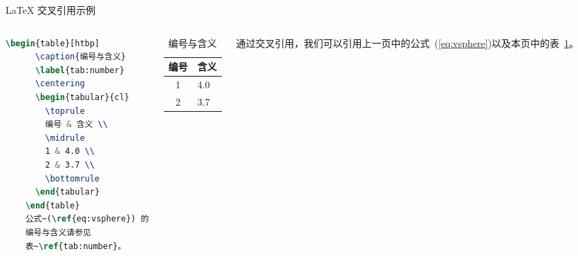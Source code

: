 \documentclass{beamer} %
\begin{document}
\begin{frame}[fragile]{\LaTeX{} 交叉引用示例}
    \begin{columns}
\begin{lstlisting}[language=TeX]
    \begin{table}[htbp]
      \caption{编号与含义}
      \label{tab:number}
      \centering
      \begin{tabular}{cl}
        \toprule
        编号 & 含义 \\
        \midrule
        1 & 4.0 \\
        2 & 3.7 \\
        \bottomrule
      \end{tabular}
    \end{table}
    公式~(\ref{eq:vsphere}) 的
    编号与含义请参见
    表~\ref{tab:number}。
\end{lstlisting}
        \begin{table}[htpb]
            \centering
            \caption{编号与含义}
            \label{tab:number}
            \begin{tabular}{cl}\toprule
                编号 & 含义 \\\midrule
                1 & 4.0\\
                2 & 3.7\\\bottomrule
            \end{tabular}
        \end{table}
        \normalsize 通过交叉引用，我们可以引用上一页中的公式~(\ref{eq:vsphere})以及本页中的表~\ref{tab:number}。
    \end{columns}
\end{frame}
\end{document}
